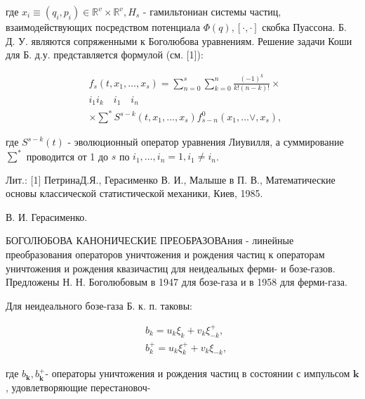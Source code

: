 \documentclass[10pt]{article}
\begin{document}
где $x_{i} \equiv\left(q_{i}, p_{i}\right) \in \mathbb{R}^{v} \times \mathbb{R}^{v}, H_{s}$ - гамильтониан системы частиц, взаимодействующих посредством потенциала $\Phi(q),[\cdot, \cdot]$ скобка Пуассона. Б. Д. У. являются сопряженными к Боголюбова уравнениям. Решение задачи Коши для Б. д.у. представляется формулой (см. [1]):



\[

\begin{aligned}

& f_{s}\left(t, x_{1}, \ldots, x_{s}\right)=\sum_{n=0}^{s} \sum_{k=0}^{n} \frac{(-1)^{k}}{k !(n-k) !} \times \\

& i_{1} i_{k} \quad i_{1} \quad i_{n} \\

& \times \sum^{*} S^{s-k}\left(t, x_{1}, \ldots, x_{s}\right) f_{s-n}^{0}\left(x_{1}, \ldots \vee, x_{s}\right) \text {, }

\end{aligned}

\]



где $S^{s-k}(t)$ - эволюционный оператор уравнения Лиувилля, а суммирование $\sum^{*}$ проводится от 1 до $s$ по $i_{1}, \ldots, i_{n}=1, i_{1} \neq i_{n}$.



Лит.: [1] ПетринаД.Я., Герасименко В. И., Малыше в П. В., Математические основы классической статистической механики, Киев, 1985.



В. И. Герасименко.



БОГОЛЮБОВА КАНОНИЧЕСКИЕ ПРЕОБРАЗОВАния - линейные преобразования операторов уничтожения и рождения частиц к операторам уничтожения и рождения квазичастиц для неидеальных ферми- и бозе-газов. Предложены Н. Н. Боголюбовым в 1947 для бозе-газа и в 1958 для ферми-газа.



Для неидеального бозе-газа Б. к. п. таковы:



\[

\begin{aligned}

& b_{k}=u_{k} \xi_{k}+v_{k} \xi_{-k}^{+}, \\

& b_{k}^{+}=u_{k} \xi_{k}^{+}+v_{k} \xi_{-k},

\end{aligned}

\]



где $b_{\boldsymbol{k}}, b_{\boldsymbol{k}}^{+}$- операторы уничтожения и рождения частиц в состоянии с импульсом $\boldsymbol{k}$, удовлетворяющие перестановоч-
\end{document}
